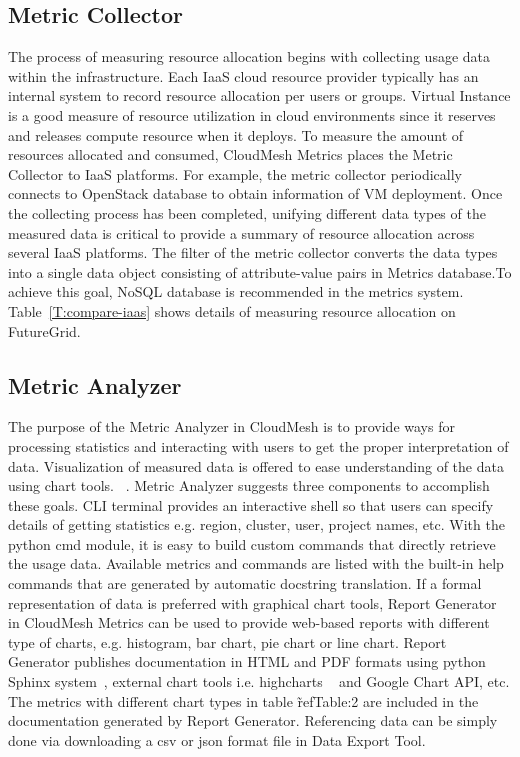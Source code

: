 \documentclass{tex/sig-alternate}
\begin{document}
{\subsection{Metric Collector}

The process of measuring resource allocation begins with collecting
usage data within the infrastructure. Each IaaS cloud resource
provider typically has an internal system to record resource
allocation per users or groups. Virtual Instance is a good measure of
resource utilization in cloud environments since it reserves and
releases compute resource when it deploys. To measure the amount of
resources allocated and consumed, CloudMesh Metrics places the Metric
Collector to IaaS platforms. For example, the metric collector
periodically connects to OpenStack database to obtain information of
VM deployment. Once the collecting process has been completed,
unifying different data types of the measured data is critical to
provide a summary of resource allocation across several IaaS
platforms. The filter of the metric collector converts the data types
into a single data object consisting of attribute-value pairs in
Metrics database.To achieve this goal, NoSQL database is recommended
in the metrics system.  Table~\ref{T:compare-iaas} shows details of
measuring resource allocation on FutureGrid.

\subsection{Metric Analyzer}

The purpose of the Metric Analyzer in CloudMesh is to provide ways for
processing statistics and interacting with users to get the proper
interpretation of data. Visualization of measured data is offered to
ease understanding of the data using chart
tools. ~\cite{kosslyn1989understanding,pinker1990theory,friel2001making}. Metric
Analyzer suggests three components to accomplish these goals. CLI
terminal provides an interactive shell so that users can specify
details of getting statistics e.g. region, cluster, user, project
names, etc. With the python cmd module, it is easy to build custom
commands that directly retrieve the usage data. Available metrics and
commands are listed with the built-in help commands that are generated
by automatic docstring translation. If a formal representation of data
is preferred with graphical chart tools, Report Generator in CloudMesh
Metrics can be used to provide web-based reports with different type
of charts, e.g. histogram, bar chart, pie chart or line chart. Report
Generator publishes documentation in HTML and PDF formats using python
Sphinx system~\cite{brandl2009sphinx}, external chart tools
i.e. highcharts ~\cite{highsoft2012highcharts} and Google Chart API,
etc. The metrics with different chart types in table \~ref{Table:2}
are included in the documentation generated by Report
Generator. Referencing data can be simply done via downloading a csv
or json format file in Data Export Tool.




}
\end{document}
